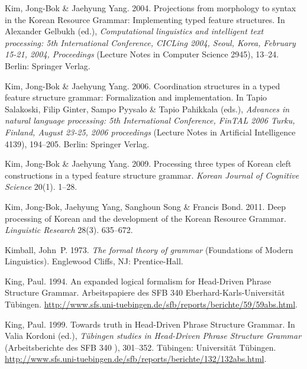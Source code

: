 \begin{thebibliography}{1420}
Kim, Jong-Bok \& Jaehyung Yang. 2004.
\newblock Projections from morphology to syntax in the {Korean Resource
  Grammar}: Implementing typed feature structures.
\newblock In Alexander Gelbukh (ed.), \emph{Computational linguistics and
  intelligent text processing: {5th International Conference, CICLing 2004,
  Seoul, Korea, February 15-21, 2004, Proceedings}} (Lecture Notes in Computer
  Science 2945), 13--24. Berlin: Springer Verlag.

Kim, Jong-Bok \& Jaehyung Yang. 2006.
\newblock Coordination structures in a typed feature structure grammar:
  Formalization and implementation.
\newblock In Tapio Salakoski, Filip Ginter, Sampo Pyysalo \& Tapio Pahikkala
  (eds.), \emph{Advances in natural language processing: {5th International
  Conference, FinTAL 2006 Turku, Finland, August} 23-25, 2006 proceedings}
  (Lecture Notes in Artificial Intelligence 4139), 194--205. Berlin: Springer
  Verlag.

Kim, Jong-Bok \& Jaehyung Yang. 2009.
\newblock Processing three types of {Korean} cleft constructions in a typed
  feature structure grammar.
\newblock \emph{Korean Journal of Cognitive Science} 20(1). 1--28.

Kim, Jong-Bok, Jaehyung Yang, Sanghoun Song \& Francis Bond. 2011.
\newblock Deep processing of {Korean} and the development of the {Korean
  Resource Grammar}.
\newblock \emph{Linguistic Research} 28(3). 635--672.

Kimball, John~P. 1973.
\newblock \emph{The formal theory of grammar}  (Foundations of Modern
  Linguistics).
\newblock Englewood Cliffs, NJ: Prentice-Hall.

King, Paul. 1994.
\newblock An expanded logical formalism for {{Head-Driven Phrase Structure
  Grammar}}.
\newblock Arbeitspapiere des SFB 340 
  Eberhard-Karls-Uni\-ver\-si\-t{\"a}t T{\"u}bingen.
\newblock
  \urlprefix\url{http://www.sfs.uni-tuebingen.de/sfb/reports/berichte/59/59abs.html}.

King, Paul. 1999.
\newblock Towards truth in {Head-Driven Phrase Structure Grammar}.
\newblock In Valia Kordoni (ed.), \emph{T{\"u}bingen studies in {Head-Driven
  Phrase Structure Grammar}} (Arbeitsberichte des SFB 340 ), 301--352.
  T{\"u}bingen: Universit{\"a}t T{\"u}bingen.
\newblock
  \urlprefix\url{http://www.sfs.uni-tuebingen.de/sfb/reports/berichte/132/132abs.html}.


\end{thebibliography}
